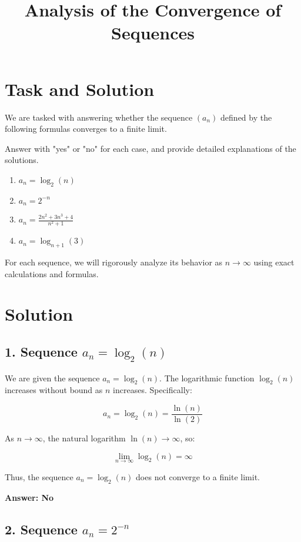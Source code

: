 \documentclass{article}
\begin{document}
\title{Analysis of the Convergence of Sequences}
\author{}
\date{}
\maketitle

\section*{Task and Solution}

We are tasked with answering whether the sequence \( (a_n) \) defined by the following formulas converges to a finite limit.

Answer with "yes" or "no" for each case, and provide detailed explanations of the solutions.

\begin{enumerate}
    \item \( a_n = \log_2(n) \)
    \item \( a_n = 2^{-n} \)
    \item \( a_n = \frac{2n^2 + 3n^3 + 4}{n^2 + 1} \)
    \item \( a_n = \log_{n+1}(3) \)
\end{enumerate}

For each sequence, we will rigorously analyze its behavior as \( n \to \infty \) using exact calculations and formulas.

\section*{Solution}

\subsection*{1. Sequence \( a_n = \log_2(n) \)}

We are given the sequence \( a_n = \log_2(n) \). The logarithmic function \( \log_2(n) \) increases without bound as \( n \) increases. Specifically:

\[
a_n = \log_2(n) = \frac{\ln(n)}{\ln(2)}
\]

As \( n \to \infty \), the natural logarithm \( \ln(n) \to \infty \), so:

\[
\lim_{n \to \infty} \log_2(n) = \infty
\]

Thus, the sequence \( a_n = \log_2(n) \) does not converge to a finite limit.

\textbf{Answer: No}

\subsection*{2. Sequence \( a_n = 2^{-n} \)}
\end{document}
